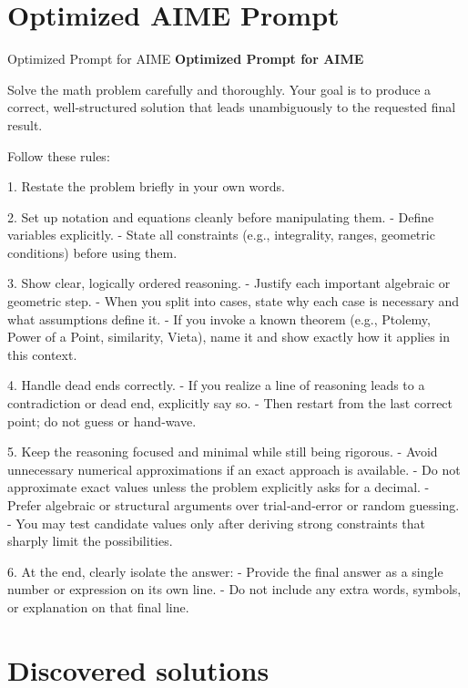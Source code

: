 \documentclass[sigconf]{acmart}
\newenvironment{promptbox}[1][]{%
  \par\smallskip
  \def\promptboxtitle{#1}%
  \begin{snugshade}%
  \ifx\promptboxtitle\empty\else
    \noindent\textbf{\small\promptboxtitle}\par\nobreak\smallskip
  \fi
  \small\ttfamily\noindent\ignorespaces
}{%
  \end{snugshade}%
  \par\smallskip
}
\begin{document}
\section{Optimized AIME Prompt}\label{app:sol-aime}

\begin{promptbox}[Optimized Prompt for AIME]
Solve the math problem carefully and thoroughly. Your goal is to produce a correct,
well‑structured solution that leads unambiguously to the requested final result.

Follow these rules:

1. Restate the problem briefly in your own words.

2. Set up notation and equations cleanly before manipulating them.
   - Define variables explicitly.
   - State all constraints (e.g., integrality, ranges, geometric conditions) before
     using them.

3. Show clear, logically ordered reasoning.
   - Justify each important algebraic or geometric step.
   - When you split into cases, state why each case is necessary and what assumptions
     define it.
   - If you invoke a known theorem (e.g., Ptolemy, Power of a Point, similarity, Vieta),
     name it and show exactly how it applies in this context.

4. Handle dead ends correctly.
   - If you realize a line of reasoning leads to a contradiction or dead end, explicitly
     say so.
   - Then restart from the last correct point; do not guess or hand‑wave.
   
5. Keep the reasoning focused and minimal while still being rigorous.
   - Avoid unnecessary numerical approximations if an exact approach is available.
   - Do not approximate exact values unless the problem explicitly asks for a decimal.
   - Prefer algebraic or structural arguments over trial‑and‑error or random guessing.
   - You may test candidate values only after deriving strong constraints that sharply
     limit the possibilities.

6. At the end, clearly isolate the answer:
   - Provide the final answer as a single number or expression on its own line.
   - Do not include any extra words, symbols, or explanation on that final line.
\end{promptbox}

\section{Discovered solutions}
\label{app:discovered_solutions}
\end{document}

